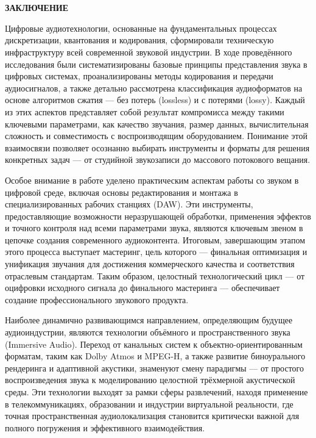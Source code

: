 \documentclass{SibFU-docs}
\begin{document}
\newpage
\section*{}
\vspace*{-2.5em}
\begin{center}\textbf{ЗАКЛЮЧЕНИЕ}\end{center}
{}

Цифровые аудиотехнологии, основанные на фундаментальных процессах дискретизации, квантования и кодирования, сформировали техническую инфраструктуру всей современной звуковой индустрии. В ходе проведённого исследования были систематизированы базовые принципы представления звука в цифровых системах, проанализированы методы кодирования и передачи аудиосигналов, а также детально рассмотрена классификация аудиоформатов на основе алгоритмов сжатия — без потерь (lossless) и с потерями (lossy). Каждый из этих аспектов представляет собой результат компромисса между такими ключевыми параметрами, как качество звучания, размер данных, вычислительная сложность и совместимость с воспроизводящим оборудованием. Понимание этой взаимосвязи позволяет осознанно выбирать инструменты и форматы для решения конкретных задач — от студийной звукозаписи до массового потокового вещания.

Особое внимание в работе уделено практическим аспектам работы со звуком в цифровой среде, включая основы редактирования и монтажа в специализированных рабочих станциях (DAW). Эти инструменты, предоставляющие возможности неразрушающей обработки, применения эффектов и точного контроля над всеми параметрами звука, являются ключевым звеном в цепочке создания современного аудиоконтента. Итоговым, завершающим этапом этого процесса выступает мастеринг, цель которого — финальная оптимизация и унификация звучания для достижения коммерческого качества и соответствия отраслевым стандартам. Таким образом, целостный технологический цикл — от оцифровки исходного сигнала до финального мастеринга — обеспечивает создание профессионального звукового продукта.

Наиболее динамично развивающимся направлением, определяющим будущее аудиоиндустрии, являются технологии объёмного и пространственного звука (Immersive Audio). Переход от канальных систем к объектно-ориентированным форматам, таким как Dolby Atmos и MPEG-H, а также развитие биноурального рендеринга и адаптивной акустики, знаменуют смену парадигмы — от простого воспроизведения звука к моделированию целостной трёхмерной акустической среды. Эти технологии выходят за рамки сферы развлечений, находя применение в телекоммуникациях, образовании и индустрии виртуальной реальности, где точная пространственная аудиолокализация становится критически важной для полного погружения и эффективного взаимодействия.
\end{document}
